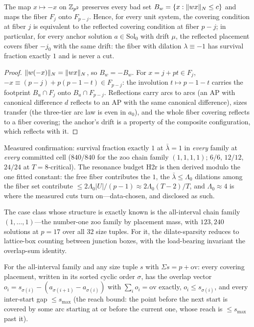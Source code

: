 \begin{lemma}\label{lem:reflect}
The map $x\mapsto-x$ on $\mathbb{Z}_{p^2}$ preserves every bad set
$B_w=\{x:\lVert wx \rVert_{N}\le c\}$ and maps the fiber $F_j$ onto $F_{p-j}$. Hence,
for every unit system, the covering condition at fiber $j$ is
equivalent to the reflected covering condition at fiber $p-j$; in
particular, for every anchor solution $a\in\mathrm{Sol}_0$ with drift
$\mu$, the reflected placement covers fiber $-j_0$ with the same drift:
the fiber with dilation $\lambda\equiv-1$ has survival fraction exactly
$1$ and is never a cut.
\end{lemma}

\begin{proof}
$\lVert w(-x) \rVert_{N}=\lVert wx \rVert_{N}$, so $B_w=-B_w$. For $x=j+pt\in F_j$,
$-x\equiv(p-j)+p(p-1-t)\in F_{p-j}$: the involution
$t\mapsto p-1-t$ carries the footprint $B_u\cap F_j$ onto
$B_u\cap F_{p-j}$. Reflections carry arcs to arcs (an AP with canonical
difference $d$ reflects to an AP with the same canonical difference),
sizes transfer (the three-tier arc law is even in $a_0$), and the whole
fiber covering reflects to a fiber covering; the anchor's drift is a
property of the composite configuration, which reflects with it.
\end{proof}

Measured confirmation: survival fraction exactly $1$ at
$\bar\lambda=1$ in \emph{every} family at \emph{every} committed cell
($840/840$ for the zoo chain family $(1,1,1,1)$; $6/6$, $12/12$,
$24/24$ at $T=8$-critical). The resonance budget H2r is then derived
modulo the one fitted constant: the free fiber contributes the $1$, the
$\bar\lambda\le\Lambda_0$ dilations among the fiber set contribute
$\le 2\Lambda_0|U|/(p-1)\approx2\Lambda_0(T-2)/T$, and $\Lambda_0\approx4$
is where the measured cuts turn on---data-chosen, and disclosed as
such.

The case class whose structure is exactly known is the all-interval
chain family $(1,\dots,1)$---the number-one zoo family by placement
mass, with $123{,}240$ solutions at $p=17$ over all $32$ size tuples.
For it, the dilate-sparsity reduces to lattice-box counting between
junction boxes, with the load-bearing invariant the overlap-sum
identity.

\begin{lemma}\label{lem:overlapsum}
For the all-interval family and any size tuple $s$ with
$\Sigma s=p+\mathrm{ov}$: every covering placement, written in its
sorted cyclic order $\sigma$, has the overlap vector
$o_i=s_{\sigma(i)}-(a_{\sigma(i+1)}-a_{\sigma(i)})$ with
$\sum_i o_i=\mathrm{ov}$ exactly, $o_i\le s_{\sigma(i)}$, and every
inter-start gap $\le s_{\max}$ (the reach bound: the point before the
next start is covered by some arc starting at or before the current
one, whose reach is $\le s_{\max}$ past it).
\end{lemma}

